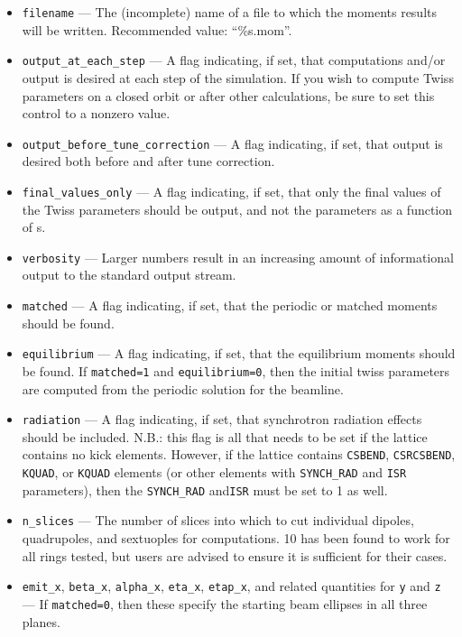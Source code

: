 \documentclass[11pt]{article}
\begin{document}
\begin{itemize}
\item \verb|filename| --- The (incomplete) name of a file to which the moments results will be written.
  Recommended value: ``\%s.mom''.
\item \verb|output_at_each_step| --- A flag indicating, if set, that computations and/or output is desired at each step of the simulation.
  If you wish to compute Twiss parameters on a closed orbit or after other calculations, be sure to set this control to a nonzero value.
\item \verb|output_before_tune_correction| --- A flag indicating, if set, that output is desired both before and after
tune correction.
\item \verb|final_values_only| --- A flag indicating, if set, that only the final values of the Twiss parameters should
be output, and not the parameters as a function of s.
\item \verb|verbosity| --- Larger numbers result in an increasing amount of informational output to the standard output stream.
\item \verb|matched| --- A flag indicating, if set, that the periodic or matched moments should be found.
\item \verb|equilibrium| --- A flag indicating, if set, that the equilibrium moments should be found.  If \verb|matched=1| and \verb|equilibrium=0|,
  then the initial twiss parameters are computed from the periodic solution for the beamline.
\item \verb|radiation| --- A flag indicating, if set, that synchrotron radiation effects should be included.
  N.B.: this flag is all that needs to be set if the lattice contains no kick elements. However, if the lattice contains \verb|CSBEND|, \verb|CSRCSBEND|, \verb|KQUAD|, 
  or \verb|KQUAD| elements (or other elements with \verb|SYNCH_RAD| and \verb|ISR| parameters), then the \verb|SYNCH_RAD| and\verb|ISR| must be set to 1 as well.
\item \verb|n_slices| --- The number of slices into which to cut individual dipoles, quadrupoles, and sextuoples for computations.
  10 has been found to work for all rings tested, but users are advised to ensure it is sufficient for their cases.
\item \verb|emit_x|, \verb|beta_x|, \verb|alpha_x|, \verb|eta_x|, \verb|etap_x|, and related quantities for \verb|y| and \verb|z| ---
  If \verb|matched=0|, then these specify the starting beam ellipses in all three planes.
\end{itemize}
\end{document}
